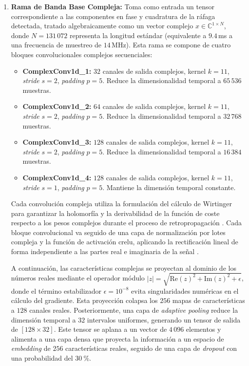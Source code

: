 \begin{enumerate}
    \item \textbf{Rama de Banda Base Compleja:}
    Toma como entrada un tensor correspondiente a las componentes en fase y cuadratura de la ráfaga detectada, tratado algebraicamente como un vector complejo $x \in \mathbb{C}^{1 \times N}$, donde $N = 131\,072$ representa la longitud estándar (equivalente a $9.4$\,ms a una frecuencia de muestreo de $14$\,MHz). Esta rama se compone de cuatro bloques convolucionales complejos secuenciales:
    \begin{itemize}
        \item \textbf{ComplexConv1d\_1:} $32$ canales de salida complejos, kernel $k=11$, \textit{stride} $s=2$, \textit{padding} $p=5$. Reduce la dimensionalidad temporal a $65\,536$ muestras.
        \item \textbf{ComplexConv1d\_2:} $64$ canales de salida complejos, kernel $k=11$, \textit{stride} $s=2$, \textit{padding} $p=5$. Reduce la dimensionalidad temporal a $32\,768$ muestras.
        \item \textbf{ComplexConv1d\_3:} $128$ canales de salida complejos, kernel $k=11$, \textit{stride} $s=2$, \textit{padding} $p=5$. Reduce la dimensionalidad temporal a $16\,384$ muestras.
        \item \textbf{ComplexConv1d\_4:} $128$ canales de salida complejos, kernel $k=11$, \textit{stride} $s=1$, \textit{padding} $p=5$. Mantiene la dimensión temporal constante.
    \end{itemize}

    Cada convolución compleja utiliza la formulación del cálculo de Wirtinger para garantizar la holomorfía y la derivabilidad de la función de coste respecto a los pesos complejos durante el proceso de retropropagación \cite{hirose_complex-valued_2012}. Cada bloque convolucional va seguido de una capa de normalización por lotes compleja y la función de activación \gls{crelu}, aplicando la rectificación lineal de forma independiente a las partes real e imaginaria de la señal \cite{trabelsi_deep_2018}.
    
    A continuación, las características complejas se proyectan al dominio de los números reales mediante el operador módulo $|z| = \sqrt{\text{Re}(z)^2 + \text{Im}(z)^2 + \epsilon}$, donde el término estabilizador $\epsilon = 10^{-8}$ evita singularidades numéricas en el cálculo del gradiente. Esta proyección colapsa los $256$ mapas de características a $128$ canales reales. Posteriormente, una capa de \textit{adaptive pooling} reduce la dimensión temporal a $32$ intervalos uniformes, generando un tensor de salida de $[128 \times 32]$. Este tensor se aplana a un vector de $4\,096$ elementos y alimenta a una capa densa que proyecta la información a un espacio de \textit{embedding} de $256$ características reales, seguido de una capa de \textit{dropout} con una probabilidad del $30~\%$.
    

\end{enumerate}
